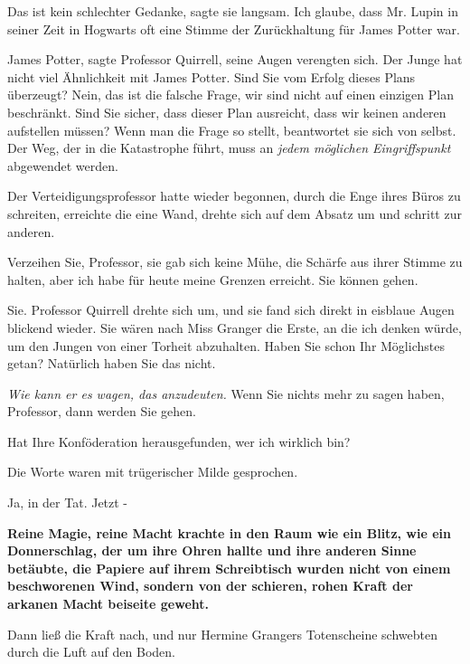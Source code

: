 \glqq{}Das ist kein schlechter Gedanke\grqq{}, sagte sie langsam. \glqq{}Ich
glaube, dass Mr. Lupin in seiner Zeit in Hogwarts oft eine Stimme der
Zurückhaltung für James Potter war.\grqq{}

\glqq{}James Potter\grqq{}, sagte Professor Quirrell, seine Augen verengten sich.
\glqq{}Der Junge hat nicht viel Ähnlichkeit mit James Potter. Sind Sie vom Erfolg
dieses Plans überzeugt? Nein, das ist die falsche Frage, wir sind nicht auf
einen einzigen Plan beschränkt. Sind Sie sicher, dass dieser Plan ausreicht,
dass wir keinen anderen aufstellen müssen? Wenn man die Frage so stellt,
beantwortet sie sich von selbst. Der Weg, der in die Katastrophe führt, muss an
\emph{jedem möglichen Eingriffspunkt} abgewendet werden.\grqq{}

Der Verteidigungsprofessor hatte wieder begonnen, durch die Enge ihres Büros zu
schreiten, erreichte die eine Wand, drehte sich auf dem Absatz um und schritt
zur anderen.

\glqq{}Verzeihen Sie, Professor\grqq{}, sie gab sich keine Mühe, die Schärfe aus
ihrer Stimme zu halten, \glqq{}aber ich habe für heute meine Grenzen erreicht.
Sie können gehen.\grqq{}

\glqq{}Sie.\grqq{} Professor Quirrell drehte sich um, und sie fand sich direkt in
eisblaue Augen blickend wieder. \glqq{}Sie wären nach Miss Granger die Erste, an
die ich denken würde, um den Jungen von einer Torheit abzuhalten. Haben Sie
schon Ihr Möglichstes getan? Natürlich haben Sie das nicht.\grqq{}

\emph{Wie kann er es wagen, das anzudeuten.}
\glqq{}Wenn Sie nichts mehr zu sagen haben, Professor, dann werden Sie
gehen.\grqq{}

\glqq{}Hat Ihre Konföderation herausgefunden, wer ich wirklich bin?\grqq{}

Die Worte waren mit trügerischer Milde gesprochen.

\glqq{}Ja, in der Tat. Jetzt -\grqq{}

\textbf{Reine Magie, reine Macht krachte in den Raum wie ein Blitz, wie ein
Donnerschlag, der um ihre Ohren hallte und ihre anderen Sinne betäubte, die
Papiere auf ihrem Schreibtisch wurden nicht von einem beschworenen Wind, sondern
von der schieren, rohen Kraft der arkanen Macht beiseite geweht.}

Dann ließ die Kraft nach, und nur Hermine Grangers Totenscheine schwebten durch
die Luft auf den Boden.

